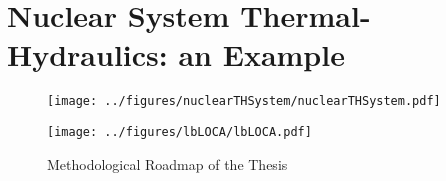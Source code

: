 \section{Nuclear System Thermal-Hydraulics: an Example}\label{sec:sys_th}

\begin{figure}[bth]
	\centering
	\texttt{[image: ../figures/nuclearTHSystem/nuclearTHSystem.pdf]}
	\caption[Illustration of Heated Channel]{}
	\label{fig:nuclear_th_system}
\end{figure}

\begin{sidewaysfigure}
	\centering
	\texttt{[image: ../figures/lbLOCA/lbLOCA.pdf]}
	\caption{Methodological Roadmap of the Thesis}
	\label{fig:methodological_roadmap}
\end{sidewaysfigure}